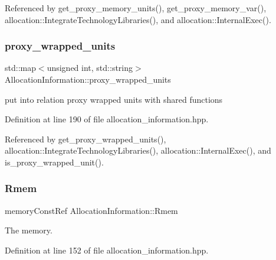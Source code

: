 Referenced by get\+\_\+proxy\+\_\+memory\+\_\+units(), get\+\_\+proxy\+\_\+memory\+\_\+var(), allocation\+::\+Integrate\+Technology\+Libraries(), and allocation\+::\+Internal\+Exec().

\mbox{\label{classAllocationInformation_af1df73d0bdd2211d14307912ead7ee5c}} 
\subsubsection{\texorpdfstring{proxy\+\_\+wrapped\+\_\+units}{proxy\_wrapped\_units}}
{\footnotesize\ttfamily std\+::map$<$unsigned int, std\+::string$>$ Allocation\+Information\+::proxy\+\_\+wrapped\+\_\+units\hspace{0.3cm}{\ttfamily [private]}}



put into relation proxy wrapped units with shared functions 



Definition at line 190 of file allocation\+\_\+information.\+hpp.



Referenced by get\+\_\+proxy\+\_\+wrapped\+\_\+units(), allocation\+::\+Integrate\+Technology\+Libraries(), allocation\+::\+Internal\+Exec(), and is\+\_\+proxy\+\_\+wrapped\+\_\+unit().

\mbox{\label{classAllocationInformation_ab502323846396f9d124a4c6d3521bfd6}} 
\subsubsection{\texorpdfstring{Rmem}{Rmem}}
{\footnotesize\ttfamily memory\+Const\+Ref Allocation\+Information\+::\+Rmem\hspace{0.3cm}{\ttfamily [private]}}



The memory. 



Definition at line 152 of file allocation\+\_\+information.\+hpp.

